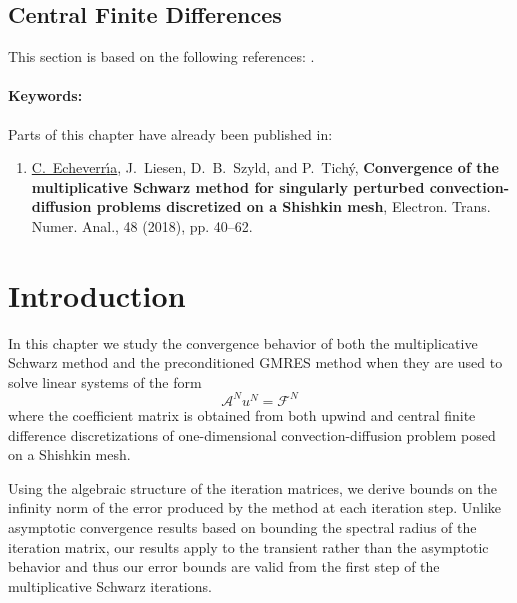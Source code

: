 \subsection{Central Finite Differences}
This section is based on the following references: \cite{EchLieSzyTic18, Smi85}.
\paragraph{Keywords:}




\else

Parts of this chapter have already been published in:
\vspace*{0.3cm}
%
\begin{enumerate}
\item[\cite{EchLieSzyTic18}] \underline{C.~Echeverr{\'\i}a}, J.~Liesen, D.~B.~Szyld, and P.~Tich{\'y}, \textbf{Convergence of the multiplicative Schwarz method for singularly perturbed convection-diffusion problems discretized on a Shishkin mesh}, Electron. Trans. Numer. Anal., 48 (2018), pp. 40--62.
\end{enumerate}
%
\vspace*{0.3cm}
%
\section{Introduction}
\label{1D:intro}

In this chapter we study the convergence behavior of both the multiplicative
Schwarz method and the preconditioned GMRES method when they are used to solve
linear systems of the form
%
\begin{equation}\label{eq:1Dlinsys}
\mathscr{A}^{N}u^{N}=\mathscr{F}^{N}
\end{equation}
%
where the coefficient matrix is obtained from both upwind and central finite
difference discretizations of one-dimensional convection-diffusion problem
posed on a Shishkin mesh.

Using the algebraic structure of the iteration matrices, we derive bounds on
the infinity norm of the error produced by the method at each iteration step.
Unlike asymptotic convergence results based on bounding the spectral radius of
the iteration matrix, our results apply to the transient rather than the
asymptotic behavior and thus our error bounds are valid from the first step of
the multiplicative Schwarz iterations.

